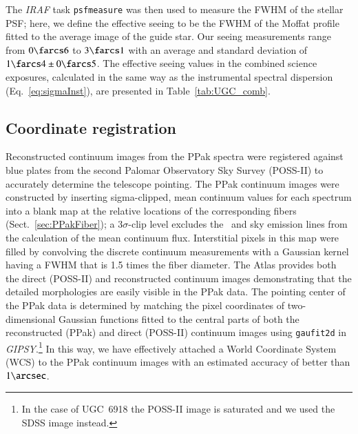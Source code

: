 \documentclass[traditabstract]{aa} %
\begin{document}
The {\it IRAF} task {\tt psfmeasure} was then used to measure the FWHM of the
stellar PSF; here, we define the effective seeing to be the FWHM of the Moffat
profile fitted to the average image of the guide star.  Our seeing measurements
range from $0\farcs6$ to $3\farcs1$ with an average and standard deviation of
$1\farcs4\pm0\farcs5$.  The effective seeing values in the combined science
exposures, calculated in the same way as the instrumental spectral dispersion
(Eq.~\ref{eq:sigmaInst}), are presented in Table~\ref{tab:UGC_comb}. 


\subsection{Coordinate registration}
\label{sec:ContMaps}
Reconstructed continuum images from the PPak spectra were registered against blue
plates from the second Palomar Observatory Sky Survey (POSS-II) to accurately
determine the telescope pointing.  The PPak continuum images were constructed by
inserting sigma-clipped, mean continuum values for each spectrum into a blank
map at the relative locations of the corresponding fibers
(Sect.~\ref{sec:PPakFiber}); a $3\sigma$-clip level excludes the \oiii\ and
sky emission lines from the calculation of the mean continuum flux.
Interstitial pixels in this map were filled by convolving the discrete continuum
measurements with a Gaussian kernel having a FWHM that is 1.5 times the fiber
diameter.  The Atlas provides both the direct (POSS-II) and reconstructed
continuum images demonstrating that the detailed morphologies are easily visible
in the PPak data.  The pointing center of the PPak data is determined by
matching the pixel coordinates of two-dimensional Gaussian functions fitted to
the central parts of both the reconstructed (PPak) and direct (POSS-II)
continuum images using {\tt gaufit2d} in {\it GIPSY}.\footnote{
%
In the case of UGC~6918 the POSS-II image is saturated and we used the SDSS
image instead.
%
}  In this way, we have effectively attached a World Coordinate System (WCS) to
the PPak continuum images with an estimated accuracy of better than $1\arcsec$.
\end{document}
